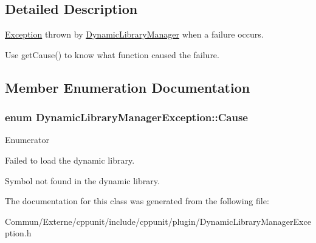 \subsection{Detailed Description}
\hyperlink{class_exception}{Exception} thrown by \hyperlink{class_dynamic_library_manager}{Dynamic\+Library\+Manager} when a failure occurs. 

Use get\+Cause() to know what function caused the failure. 

\subsection{Member Enumeration Documentation}
\subsubsection[{\texorpdfstring{Cause}{Cause}}]{\setlength{\rightskip}{0pt plus 5cm}enum {\bf Dynamic\+Library\+Manager\+Exception\+::\+Cause}}\hypertarget{class_dynamic_library_manager_exception_a73b4694c152e0693fbc19fb04987a0b9}{}\label{class_dynamic_library_manager_exception_a73b4694c152e0693fbc19fb04987a0b9}
\begin{Desc}
\item[Enumerator]\par
\begin{description}
\item[{\em 
loading\+Failed\hypertarget{class_dynamic_library_manager_exception_a73b4694c152e0693fbc19fb04987a0b9a778b42fb996bf018bdc26934649cad63}{}\label{class_dynamic_library_manager_exception_a73b4694c152e0693fbc19fb04987a0b9a778b42fb996bf018bdc26934649cad63}
}]Failed to load the dynamic library. \item[{\em 
symbol\+Not\+Found\hypertarget{class_dynamic_library_manager_exception_a73b4694c152e0693fbc19fb04987a0b9a193fc58bb852e09790da269e2b613045}{}\label{class_dynamic_library_manager_exception_a73b4694c152e0693fbc19fb04987a0b9a193fc58bb852e09790da269e2b613045}
}]Symbol not found in the dynamic library. \end{description}
\end{Desc}


The documentation for this class was generated from the following file\+:\begin{DoxyCompactItemize}
\item 
Commun/\+Externe/cppunit/include/cppunit/plugin/Dynamic\+Library\+Manager\+Exception.\+h\end{DoxyCompactItemize}
